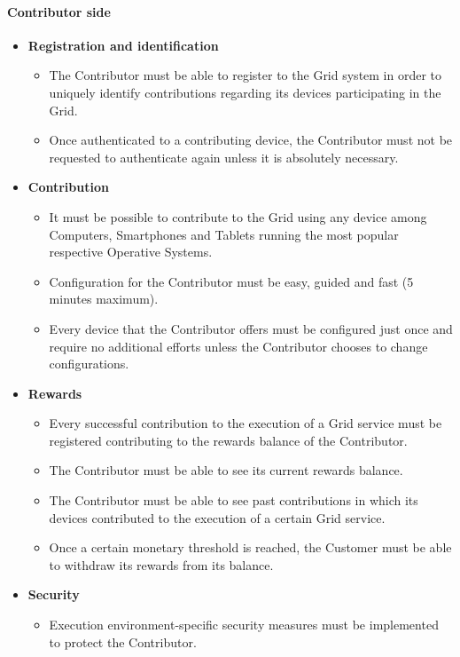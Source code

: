 \paragraph{Contributor side}
\begin{itemize}
    \item \textbf{Registration and identification}
    \begin{itemize}
        \item The Contributor must be able to register to the Grid system in order to uniquely identify contributions regarding its devices participating in the Grid.
        \item Once authenticated to a contributing device, the Contributor must not be requested to authenticate again unless it is absolutely necessary.
    \end{itemize}
    \item \textbf{Contribution}
    \begin{itemize}
        \item It must be possible to contribute to the Grid using any device among Computers, Smartphones and Tablets running the most popular respective Operative Systems.
        \item Configuration for the Contributor must be easy, guided and fast (5 minutes maximum).
        \item Every device that the Contributor offers must be configured just once and require no additional efforts unless the Contributor chooses to change configurations.
    \end{itemize}
    \item \textbf{Rewards}
    \begin{itemize}
        \item Every successful contribution to the execution of a Grid service must be registered contributing to the rewards balance of the Contributor.
        \item The Contributor must be able to see its current rewards balance.
        \item The Contributor must be able to see past contributions in which its devices contributed to the execution of a certain Grid service.
        \item Once a certain monetary threshold is reached, the Customer must be able to withdraw its rewards from its balance.
    \end{itemize}
    \item \textbf{Security}
    \begin{itemize}
        \item Execution environment-specific security measures must be implemented to protect the Contributor.

\end{itemize}
\end{itemize}
